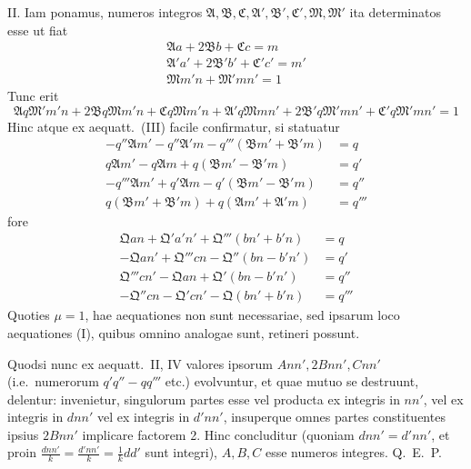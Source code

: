 \documentclass[12pt,a4paper]{article}
\theoremstyle{plain}
\theoremstyle{definition}
\theoremstyle{remark}
\theoremstyle{problemstyle}
\begin{document}
II. Iam ponamus, numeros integros $\mathfrak{A}, \mathfrak{B}, \mathfrak{C}, \mathfrak{A}', \mathfrak{B}', \mathfrak{C}', \mathfrak{M}, \mathfrak{M}'$ ita determinatos esse ut fiat
\begin{gather*}
\mathfrak{A}a + 2\mathfrak{B}b + \mathfrak{C}c = m \\
\mathfrak{A}'a' + 2\mathfrak{B}'b' + \mathfrak{C}'c' = m' \\
\mathfrak{M}m'n + \mathfrak{M}'mn' = 1
\end{gather*}
Tunc erit
\[
\mathfrak{A}q\mathfrak{M}'m'n + 2\mathfrak{B}q\mathfrak{M}m'n + \mathfrak{C}q\mathfrak{M}m'n + \mathfrak{A}'q\mathfrak{M}mn' + 2\mathfrak{B}'q\mathfrak{M}'mn' + \mathfrak{C}'q\mathfrak{M}'mn' = 1
\]
Hinc atque ex aequatt.\ (III) facile confirmatur, si statuatur
\begin{align*}
-q''\mathfrak{A}m' - q''\mathfrak{A}'m - q'''(\mathfrak{B}m' + \mathfrak{B}'m) &= q \\
q\mathfrak{A}m' - q\mathfrak{A}m + q(\mathfrak{B}m' - \mathfrak{B}'m) &= q' \\
-q'''\mathfrak{A}m' + q'\mathfrak{A}m - q'(\mathfrak{B}m' - \mathfrak{B}'m) &= q'' \\
q(\mathfrak{B}m' + \mathfrak{B}'m) + q(\mathfrak{A}m' + \mathfrak{A}'m) &= q'''
\end{align*}
fore
\begin{align*}
\mathfrak{Q}an + \mathfrak{Q}'a'n' + \mathfrak{Q}'''(bn' + b'n) &= q \tag{IV} \\
-\mathfrak{Q}an' + \mathfrak{Q}'''cn - \mathfrak{Q}''(bn - b'n') &= q' \\
\mathfrak{Q}'''cn' - \mathfrak{Q}an + \mathfrak{Q}'(bn - b'n') &= q'' \\
-\mathfrak{Q}''cn - \mathfrak{Q}'cn' - \mathfrak{Q}(bn' + b'n) &= q'''
\end{align*}
Quoties $\mu = 1$, hae aequationes non sunt necessariae, sed ipsarum loco aequationes (I), quibus omnino analogae sunt, retineri possunt.

Quodsi nunc ex aequatt.\ II, IV valores ipsorum $Ann', 2Bnn', Cnn'$ (i.e.\ numerorum $q'q'' - qq'''$ etc.) evolvuntur, et quae mutuo se destruunt, delentur: invenietur, singulorum partes esse vel producta ex integris in $nn'$, vel ex integris in $dnn'$ vel ex integris in $d'nn'$, insuperque omnes partes constituentes ipsius $2Bnn'$ implicare factorem 2. Hinc concluditur (quoniam $dnn' = d'nn'$, et proin $\frac{dnn'}{k} = \frac{d'nn'}{k} = \tfrac{1}{k}dd'$ sunt integri), $A, B, C$ esse numeros integres. Q.\ E.\ P.
\end{document}
